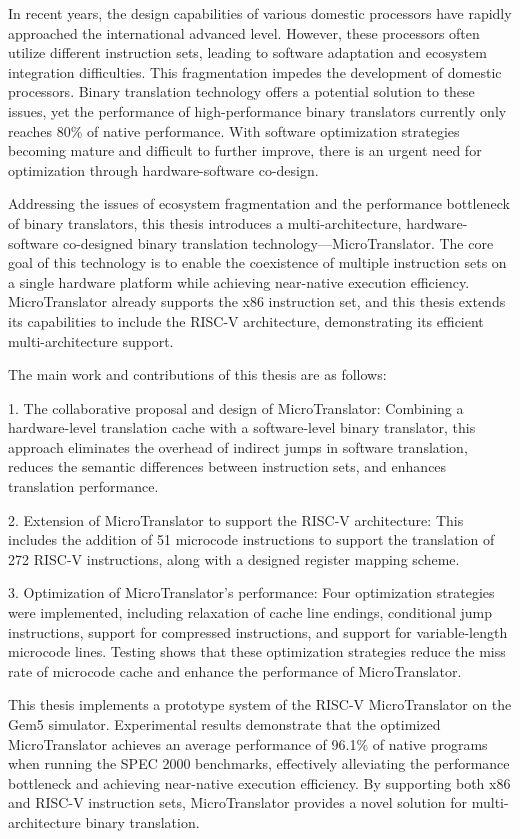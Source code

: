 In recent years, the design capabilities of various domestic processors have rapidly approached the international advanced level. 
However, these processors often utilize different instruction sets, leading to software adaptation and ecosystem integration difficulties. This fragmentation impedes the development of domestic processors. Binary translation technology offers a potential solution to these issues, yet the performance of high-performance binary translators currently only reaches 80\% of native performance. With software optimization strategies becoming mature and difficult to further improve, there is an urgent need for optimization through hardware-software co-design.

Addressing the issues of ecosystem fragmentation and the performance bottleneck of binary translators, this thesis introduces a multi-architecture, hardware-software co-designed binary translation technology—MicroTranslator. The core goal of this technology is to enable the coexistence of multiple instruction sets on a single hardware platform while achieving near-native execution efficiency. MicroTranslator already supports the x86 instruction set, and this thesis extends its capabilities to include the RISC-V architecture, demonstrating its efficient multi-architecture support.

The main work and contributions of this thesis are as follows:

1. The collaborative proposal and design of MicroTranslator: Combining a hardware-level translation cache with a software-level binary translator, this approach eliminates the overhead of indirect jumps in software translation, reduces the semantic differences between instruction sets, and enhances translation performance.

2. Extension of MicroTranslator to support the RISC-V architecture: This includes the addition of 51 microcode instructions to support the translation of 272 RISC-V instructions, along with a designed register mapping scheme.

3. Optimization of MicroTranslator's performance: Four optimization strategies were implemented, including relaxation of cache line endings, conditional jump instructions, support for compressed instructions, and support for variable-length microcode lines. Testing shows that these optimization strategies reduce the miss rate of microcode cache and enhance the performance of MicroTranslator.

This thesis implements a prototype system of the RISC-V MicroTranslator on the Gem5 simulator. Experimental results demonstrate that the optimized MicroTranslator achieves an average performance of 96.1\% of native programs when running the SPEC 2000 benchmarks, effectively alleviating the performance bottleneck and achieving near-native execution efficiency. By supporting both x86 and RISC-V instruction sets, MicroTranslator provides a novel solution for multi-architecture binary translation.


\pagestyle{enfrontmatterstyle}%
\cleardoublepage\pagestyle{frontmatterstyle}%

